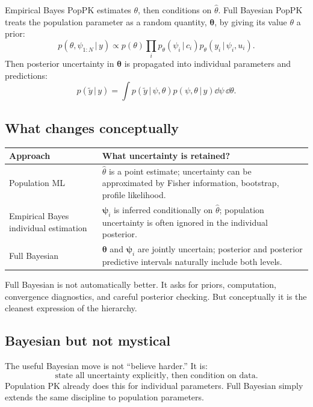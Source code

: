 \documentclass[a4paper]{article}
\newcommand{\rpsi}{\boldsymbol{\psi}}
\newcommand{\rtheta}{\boldsymbol{\theta}}
\newcommand{\given}{\,|\,}
\begin{document}
Empirical Bayes PopPK estimates \(\theta\), then conditions on \(\widehat\theta\). Full Bayesian PopPK treats the population parameter as a random quantity, \(\rtheta\), by giving its value \(\theta\) a prior:
\[
  p(\theta,\psi_{1:N}\given y)
  \propto
  p(\theta)
  \prod_i
  p_\theta(\psi_i\given c_i)
  p_\theta(y_i\given \psi_i,u_i).
\]
Then posterior uncertainty in \(\rtheta\) is propagated into individual parameters and predictions:
\[
  p(\tilde y\given y)
  =
  \int
  p(\tilde y\given \psi,\theta)
  p(\psi,\theta\given y)
  \dd\psi\,\dd\theta.
\]

\subsection{What changes conceptually}

\begin{center}
\begin{tabularx}{0.96\textwidth}{p{}X}
\toprule
Approach & What uncertainty is retained? \\
\midrule
Population ML & \(\widehat\theta\) is a point estimate; uncertainty can be approximated by Fisher information, bootstrap, profile likelihood. \\
Empirical Bayes individual estimation & \(\rpsi_i\) is inferred conditionally on \(\widehat\theta\); population uncertainty is often ignored in the individual posterior. \\
Full Bayesian & \(\rtheta\) and \(\rpsi_i\) are jointly uncertain; posterior and posterior predictive intervals naturally include both levels. \\
\bottomrule
\end{tabularx}
\end{center}

Full Bayesian is not automatically better. It asks for priors, computation, convergence diagnostics, and careful posterior checking. But conceptually it is the cleanest expression of the hierarchy.

\subsection{Bayesian but not mystical}

The useful Bayesian move is not ``believe harder.'' It is:
\[
  \text{state all uncertainty explicitly, then condition on data}.
\]
Population PK already does this for individual parameters. Full Bayesian simply extends the same discipline to population parameters.
\end{document}
